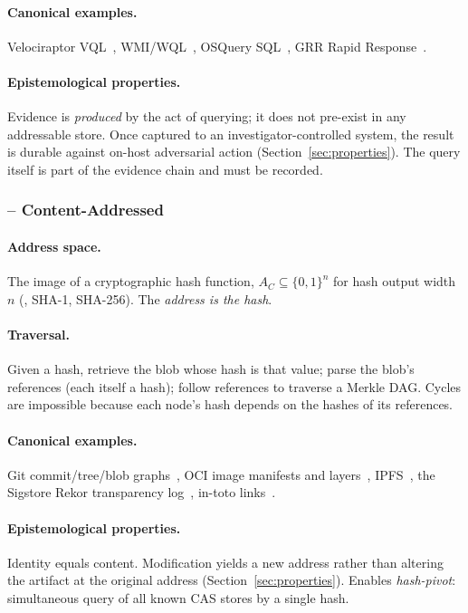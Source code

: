 \paragraph{Canonical examples.} Velociraptor VQL~\cite{velociraptor},
WMI/WQL~\cite{microsoft2023wmi}, OSQuery SQL~\cite{osquery}, GRR
Rapid Response~\cite{cohen2011distributed}.
\paragraph{Epistemological properties.} Evidence is \emph{produced} by the
act of querying; it does not pre-exist in any addressable store. Once
captured to an investigator-controlled system, the result is durable against
on-host adversarial action (Section~\ref{sec:properties}). The query itself
is part of the evidence chain and must be recorded.

\subsubsection{ -- Content-Addressed}

\paragraph{Address space.} The image of a cryptographic hash function, $A_{C}
\subseteq \{0,1\}^{n}$ for hash output width $n$ (\eg{}, SHA-1, SHA-256). The
\emph{address is the hash}.
\paragraph{Traversal.} Given a hash, retrieve the blob whose hash is that
value; parse the blob's references (each itself a hash); follow references
to traverse a Merkle DAG. Cycles are impossible because each node's hash
depends on the hashes of its references.
\paragraph{Canonical examples.} Git commit/tree/blob graphs~\cite{chacon2014progit},
OCI image manifests and layers~\cite{ociimagespec}, IPFS~\cite{benet2014ipfs},
the Sigstore Rekor transparency log~\cite{newman2022sigstore},
in-toto links~\cite{torresarias2019intoto}.
\paragraph{Epistemological properties.} Identity equals content. Modification
yields a new address rather than altering the artifact at the original
address (Section~\ref{sec:properties}). Enables \emph{hash-pivot}:
simultaneous query of all known CAS stores by a single hash.

